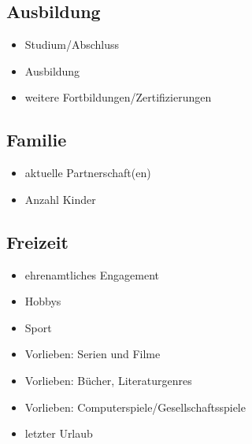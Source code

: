 \subsection{Ausbildung}

\begin{multicols}{2}
  \begin{itemize}
    \item Studium/Abschluss
    \item Ausbildung
    \item weitere Fortbildungen/Zertifizierungen
  \end{itemize}
\end{multicols}


\subsection{Familie}

\begin{multicols}{2}
  \begin{itemize}
    \item aktuelle Partnerschaft(en)
    \item Anzahl Kinder
  \end{itemize}
\end{multicols}


\subsection{Freizeit}

\begin{multicols}{2}
  \begin{itemize}
    \item ehrenamtliches Engagement
    \item Hobbys
    \item Sport
    \item Vorlieben: Serien und Filme
    \item Vorlieben: Bücher, Literaturgenres
    \item Vorlieben: Computerspiele/Gesellschaftsspiele
    \item letzter Urlaub
  \end{itemize}
\end{multicols}

